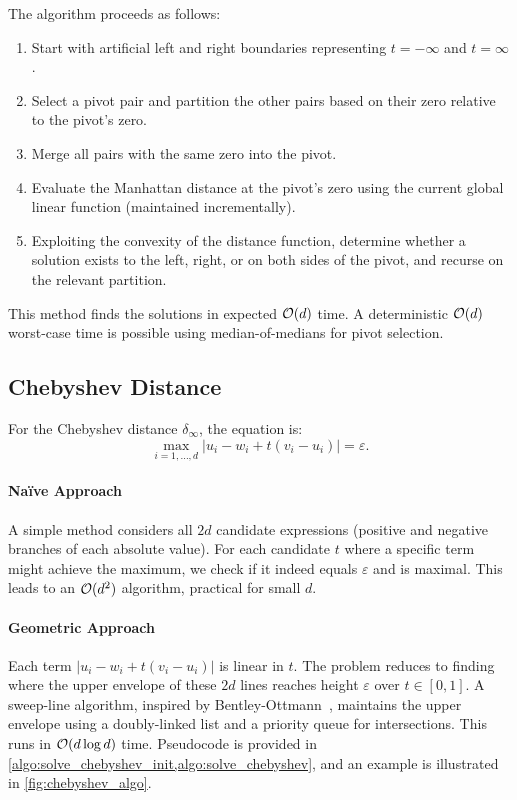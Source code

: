 The algorithm proceeds as follows:
\begin{enumerate}
	\item Start with artificial left and right boundaries representing \(t = -\infty\) and \(t = \infty\).
	\item Select a pivot pair and partition the other pairs based on their zero relative to the pivot's zero.
	\item Merge all pairs with the same zero into the pivot.
	\item Evaluate the Manhattan distance at the pivot's zero using the current global linear function (maintained incrementally).
	\item Exploiting the convexity of the distance function, determine whether a solution exists to the left, right, or on both sides of the pivot, and recurse on the relevant partition.
\end{enumerate}

This method finds the solutions in expected \(\mathcal{O}(d)\) time. A deterministic \(\mathcal{O}(d)\) worst-case time is possible using median-of-medians for pivot selection.

\subsection{Chebyshev Distance}
\label{ssec:eq_chebyshev_distance}
For the Chebyshev distance \(\delta_\infty\), the equation is:
\begin{equation}
  \max_{i = 1,\dots, d} |u_i - w_i + t(v_i - u_i)| = \varepsilon.\label{eq:solve_chebyshev}
\end{equation}

\paragraph{Na\"ive Approach}
A simple method considers all \(2d\) candidate expressions (positive and negative branches of each absolute value). For each candidate \(t\) where a specific term might achieve the maximum, we check if it indeed equals \(\varepsilon\) and is maximal. This leads to an \(\mathcal{O}(d^2)\) algorithm, practical for small \(d\).

\paragraph{Geometric Approach}
Each term \(|u_i - w_i + t(v_i - u_i)|\) is linear in \(t\). The problem reduces to finding where the upper envelope of these \(2d\) lines reaches height \(\varepsilon\) over \(t \in [0,1]\). A sweep-line algorithm, inspired by Bentley-Ottmann~\cite{computational_geometry}, maintains the upper envelope using a doubly-linked list and a priority queue for intersections. This runs in \(\mathcal{O}(d \log d)\) time. Pseudocode is provided in \cref{algo:solve_chebyshev_init,algo:solve_chebyshev}, and an example is illustrated in \cref{fig:chebyshev_algo}.

